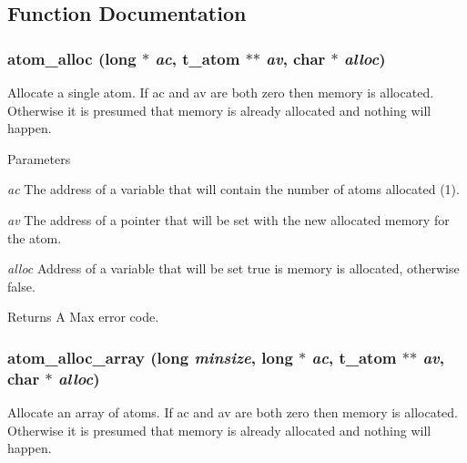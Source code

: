 \subsection{Function Documentation}
\hypertarget{group__atom_gad1a3b8eed4c311ec41b2d565bf40b002}{
\subsubsection[{atom\_\-alloc}]{ atom\_\-alloc (long $\ast$ {\em ac}, \/  {\bf t\_\-atom} $\ast$$\ast$ {\em av}, \/  char $\ast$ {\em alloc})}}
\label{group__atom_gad1a3b8eed4c311ec41b2d565bf40b002}


Allocate a single atom. If ac and av are both zero then memory is allocated. Otherwise it is presumed that memory is already allocated and nothing will happen.


\begin{DoxyParams}{Parameters}
\item[{\em ac}]The address of a variable that will contain the number of atoms allocated (1). \item[{\em av}]The address of a pointer that will be set with the new allocated memory for the atom. \item[{\em alloc}]Address of a variable that will be set true is memory is allocated, otherwise false. \end{DoxyParams}
\begin{DoxyReturn}{Returns}
A Max error code. 
\end{DoxyReturn}
\hypertarget{group__atom_ga5601306b4b76f338501cda586a6c1fde}{
\subsubsection[{atom\_\-alloc\_\-array}]{ atom\_\-alloc\_\-array (long {\em minsize}, \/  long $\ast$ {\em ac}, \/  {\bf t\_\-atom} $\ast$$\ast$ {\em av}, \/  char $\ast$ {\em alloc})}}
\label{group__atom_ga5601306b4b76f338501cda586a6c1fde}


Allocate an array of atoms. If ac and av are both zero then memory is allocated. Otherwise it is presumed that memory is already allocated and nothing will happen.


